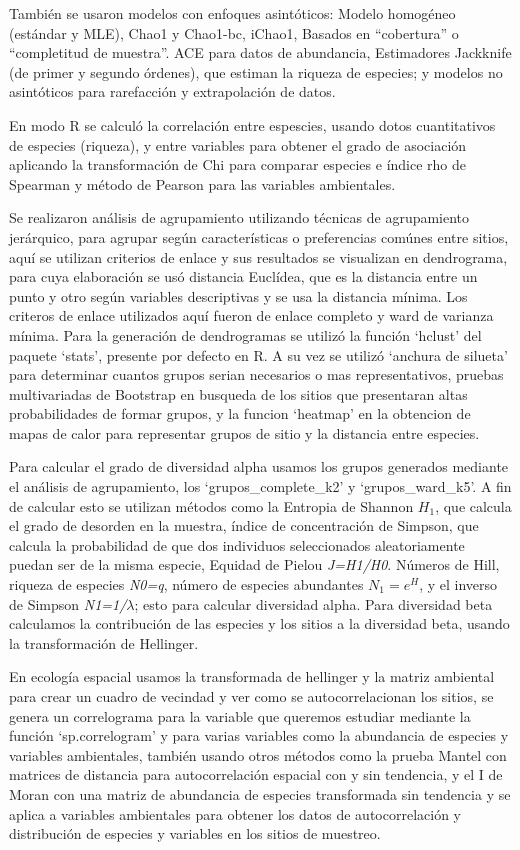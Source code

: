 \documentclass[11pt,]{article}
\begin{document}
También se usaron modelos con enfoques asintóticos: Modelo homogéneo
(estándar y MLE), Chao1 y Chao1-bc, iChao1, Basados en ``cobertura'' o
``completitud de muestra''. ACE para datos de abundancia, Estimadores
Jackknife (de primer y segundo órdenes), que estiman la riqueza de
especies; y modelos no asintóticos para rarefacción y extrapolación de
datos.

En modo R se calculó la correlación entre espescies, usando dotos
cuantitativos de especies (riqueza), y entre variables para obtener el
grado de asociación aplicando la transformación de Chi para comparar
especies e índice rho de Spearman y método de Pearson para las variables
ambientales.

Se realizaron análisis de agrupamiento utilizando técnicas de
agrupamiento jerárquico, para agrupar según características o
preferencias comúnes entre sitios, aquí se utilizan criterios de enlace
y sus resultados se visualizan en dendrograma, para cuya elaboración se
usó distancia Euclídea, que es la distancia entre un punto y otro según
variables descriptivas y se usa la distancia mínima. Los criteros de
enlace utilizados aquí fueron de enlace completo y ward de varianza
mínima. Para la generación de dendrogramas se utilizó la función
`hclust' del paquete `stats', presente por defecto en R. A su vez se
utilizó `anchura de silueta' para determinar cuantos grupos serian
necesarios o mas representativos, pruebas multivariadas de Bootstrap en
busqueda de los sitios que presentaran altas probabilidades de formar
grupos, y la funcion `heatmap' en la obtencion de mapas de calor para
representar grupos de sitio y la distancia entre especies.

Para calcular el grado de diversidad alpha usamos los grupos generados
mediante el análisis de agrupamiento, los `grupos\_complete\_k2' y
`grupos\_ward\_k5'. A fin de calcular esto se utilizan métodos como la
Entropia de Shannon \(H_1\), que calcula el grado de desorden en la
muestra, índice de concentración de Simpson, que calcula la probabilidad
de que dos individuos seleccionados aleatoriamente puedan ser de la
misma especie, Equidad de Pielou \emph{J=H1/H0}. Números de Hill,
riqueza de especies \emph{N0=q}, número de especies abundantes
\(N_1=e^H\), y el inverso de Simpson \emph{N1=1/\(\lambda\)}; esto para
calcular diversidad alpha. Para diversidad beta calculamos la
contribución de las especies y los sitios a la diversidad beta, usando
la transformación de Hellinger.

En ecología espacial usamos la transformada de hellinger y la matriz
ambiental para crear un cuadro de vecindad y ver como se
autocorrelacionan los sitios, se genera un correlograma para la variable
que queremos estudiar mediante la función `sp.correlogram' y para varias
variables como la abundancia de especies y variables ambientales,
también usando otros métodos como la prueba Mantel con matrices de
distancia para autocorrelación espacial con y sin tendencia, y el I de
Moran con una matriz de abundancia de especies transformada sin
tendencia y se aplica a variables ambientales para obtener los datos de
autocorrelación y distribución de especies y variables en los sitios de
muestreo.
\end{document}
